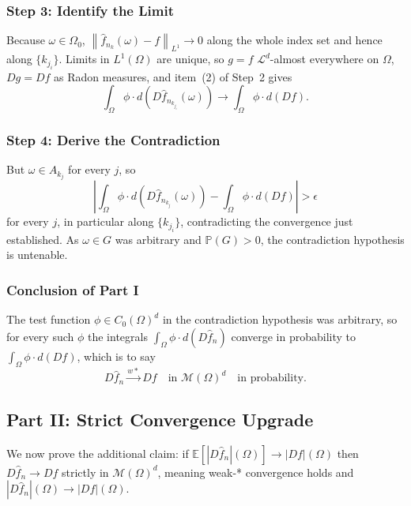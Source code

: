 \documentclass[12pt,a4paper]{article}
\numberwithin{equation}{section}
\theoremstyle{plain}
\theoremstyle{definition}
\newcommand{\norm}[1]{\left\| #1 \right\|}
\newcommand{\E}{\mathbb{E}}
\newcommand{\Lone}{L^1(\Omega)}
\newcommand{\cM}{\mathcal{M}(\Omega)^d}
\newcommand{\fn}{\hat{f}_n}
\newcommand{\Prob}{\mathbb{P}}
\begin{document}
	\subsubsection*{Step 3: Identify the Limit}

	Because $\omega \in \Omega_0$, $\norm{\hat{f}_{n_k}(\omega) - f}_{L^1} \to 0$
	along the whole index set and hence along $\{k_{j_i}\}$. Limits in $\Lone$
	are unique, so $g = f$ $\mathcal{L}^d$-almost everywhere on $\Omega$,
	$Dg = Df$ as Radon measures, and item~(2) of Step~2 gives
	\begin{equation}
		\int_\Omega \phi \cdot d\!\left(D\hat{f}_{n_{k_{j_i}}}(\omega)\right)
		\longrightarrow \int_\Omega \phi \cdot d(Df) .
	\end{equation}

	\subsubsection*{Step 4: Derive the Contradiction}

	But $\omega \in A_{k_j}$ for every $j$, so
	\begin{equation}
		\left|\int_\Omega \phi \cdot d\!\left(D\hat{f}_{n_{k_j}}(\omega)\right)
		- \int_\Omega \phi \cdot d(Df)\right| > \epsilon
	\end{equation}
	for every $j$, in particular along $\{k_{j_i}\}$, contradicting the
	convergence just established. As $\omega \in G$ was arbitrary and
	$\Prob(G) > 0$, the contradiction hypothesis is untenable.

	\subsubsection*{Conclusion of Part I}

	The test function $\phi \in C_0(\Omega)^d$ in the contradiction hypothesis
	was arbitrary, so for every such $\phi$ the integrals
	$\int_\Omega \phi \cdot d(D\fn)$ converge in probability to
	$\int_\Omega \phi \cdot d(Df)$, which is to say
	\begin{equation}
		D\fn \xrightarrow{w*} Df \quad \text{in } \cM
		\quad \text{in probability.}
	\end{equation}

	\subsection{Part II: Strict Convergence Upgrade}
	
	We now prove the additional claim: if $\E[|D\fn|(\Omega)] \to |Df|(\Omega)$
	then $D\fn \to Df$ strictly in $\cM$, meaning weak-* convergence holds and
	$|D\fn|(\Omega) \to |Df|(\Omega)$.
	
\end{document}
